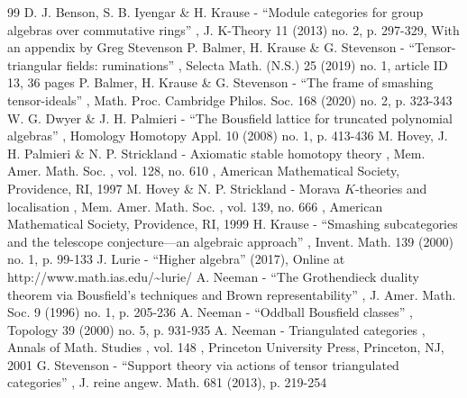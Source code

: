 \documentclass[11pt]{article}
\begin{document}
\begin{thebibliography}{99}
 D. J. Benson, S. B. Iyengar \& H. Krause - “Module categories for group algebras over commutative rings” , J. K-Theory 11 (2013) no. 2, p. 297-329, With an appendix by Greg Stevenson
 P. Balmer, H. Krause \& G. Stevenson - “Tensor-triangular fields: ruminations” , Selecta Math. (N.S.) 25 (2019) no. 1, article ID 13, 36 pages
 P. Balmer, H. Krause \& G. Stevenson - “The frame of smashing tensor-ideals” , Math. Proc. Cambridge Philos. Soc. 168 (2020) no. 2, p. 323-343
 W. G. Dwyer \& J. H. Palmieri - “The Bousfield lattice for truncated polynomial algebras” , Homology Homotopy Appl. 10 (2008) no. 1, p. 413-436
 M. Hovey, J. H. Palmieri \& N. P. Strickland - Axiomatic stable homotopy theory , Mem. Amer. Math. Soc. , vol. 128, no. 610 , American Mathematical Society, Providence, RI, 1997
 M. Hovey \& N. P. Strickland - Morava $K$-theories and localisation , Mem. Amer. Math. Soc. , vol. 139, no. 666 , American Mathematical Society, Providence, RI, 1999
 H. Krause - “Smashing subcategories and the telescope conjecture—an algebraic approach” , Invent. Math. 139 (2000) no. 1, p. 99-133
 J. Lurie - “Higher algebra” (2017), Online at http://www.math.ias.edu/\textasciitilde{}lurie/
 A. Neeman - “The Grothendieck duality theorem via Bousfield’s techniques and Brown representability” , J. Amer. Math. Soc. 9 (1996) no. 1, p. 205-236
 A. Neeman - “Oddball Bousfield classes” , Topology 39 (2000) no. 5, p. 931-935
 A. Neeman - Triangulated categories , Annals of Math. Studies , vol. 148 , Princeton University Press, Princeton, NJ, 2001
 G. Stevenson - “Support theory via actions of tensor triangulated categories” , J. reine angew. Math. 681 (2013), p. 219-254
\end{thebibliography}
\end{document}
